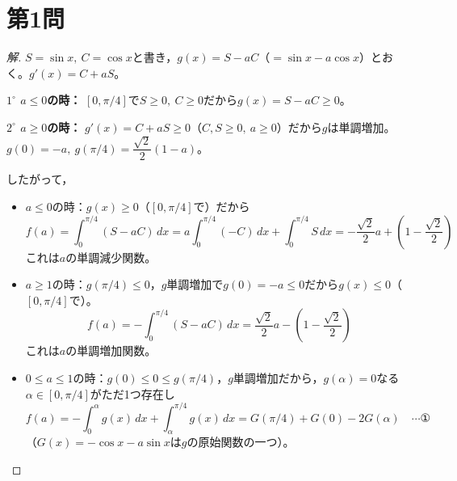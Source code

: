 \documentclass[../main.tex]{subfiles}
\begin{document}
\section*{第1問}

\begin{proof}[解]
  $S=\sin x,\ C=\cos x$と書き，$g(x)=S-aC$（$=\sin x-a\cos x$）とおく。$g'(x)=C+aS$。

  \textbf{$1^\circ$ $a\le0$の時：} $[0,\pi/4]$で$S\ge0,\ C\ge0$だから$g(x)=S-aC\ge0$。

  \textbf{$2^\circ$ $a\ge0$の時：} $g'(x)=C+aS\ge0$（$C,S\ge0,\ a\ge0$）だから$g$は単調増加。$g(0)=-a,\ g(\pi/4)=\dfrac{\sqrt2}2(1-a)$。

  したがって，
  \begin{itemize}
    \item $a\le0$の時：$g(x)\ge0$（$[0,\pi/4]$で）だから
      \[
        f(a)=\int_0^{\pi/4}(S-aC)\,dx=a\int_0^{\pi/4}(-C)\,dx+\int_0^{\pi/4}S\,dx=-\frac{\sqrt2}2a+\left(1-\frac{\sqrt2}2\right)
      \]
      これは$a$の単調減少関数。
    \item $a\ge1$の時：$g(\pi/4)\le0$，$g$単調増加で$g(0)=-a\le0$だから$g(x)\le0$（$[0,\pi/4]$で）。
      \[
        f(a)=-\int_0^{\pi/4}(S-aC)\,dx=\frac{\sqrt2}2a-\left(1-\frac{\sqrt2}2\right)
      \]
      これは$a$の単調増加関数。
    \item $0\le a\le1$の時：$g(0)\le0\le g(\pi/4)$，$g$単調増加だから，$g(\alpha)=0$なる$\alpha\in[0,\pi/4]$がただ1つ存在し
      \[
        f(a)=-\int_0^\alpha g(x)\,dx+\int_\alpha^{\pi/4}g(x)\,dx=G(\pi/4)+G(0)-2G(\alpha) \quad\cdots\text{①}
      \]
      （$G(x)=-\cos x-a\sin x$は$g$の原始関数の一つ）。
  \end{itemize}


\end{proof}
\end{document}

